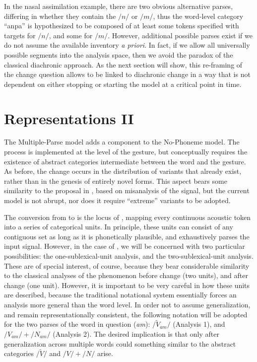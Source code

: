 In the nasal assimilation example, there are two obvious alternative
parses, differing in whether they contain the  $/n/$ or $/m/$,
thus the word-level category “anpa” is hypothesized to be composed
of at least some tokens specified with  targets for $/n/$,
and some for $/m/$. However, additional possible parses exist if
we do not assume the available  inventory \emph{a priori}.
In fact, if we allow all universally possible segments into the analysis
space, then we avoid the  paradox of the classical diachronic
approach. As the next section will show, this re-framing of the change
question allows  to be linked to diachronic change
in a way that is not dependent on either stopping or starting the
model at a critical point in time. 

\section{Representations II}

The Multiple-Parse model adds a  component to the No-Phoneme
model. The process is implemented at the level of the 
gesture, but conceptually requires the existence of abstract categories
intermediate between the word and the gesture. As before, the change
occurs in the distribution of variants that already exist, rather
than in the genesis of entirely novel forms. This aspect bears some
similarity to the proposal in \citet{Baker2011}, based on misanalysis
of the signal, but the current model is not abrupt, nor does it require
“extreme” variants to be adopted.

The conversion from  to  is the locus of 
, mapping every continuous acoustic token into a series of
categorical units. In principle, these units can consist of any contiguous
set as long as it is phonetically plausible, and exhaustively parses
the input signal. However, in the case of , we will
be concerned with two particular possibilities: the one-sublexical-unit
analysis, and the two-sublexical-unit analysis. These are of special
interest, of course, because they bear considerable similarity to
the classical analyses of the phenomenon before change (two units),
and after change (one unit). However, it is important to be very careful
in how these units are described, because the traditional notational
system essentially forces an analysis more general than the
word level. In order not to assume generalization, and remain representationally
consistent, the following notation will be adopted for the two 
parses of the word in question (\textit{am}): $/\tilde{V}_{am}/$ (Analysis
1), and $/V_{am}/+/N_{am}/$ (Analysis 2). The desired implication
is that only after generalization across multiple words could something
similar to the abstract categories $/\widetilde{V}/$ and $/V/+/N/$
arise.

